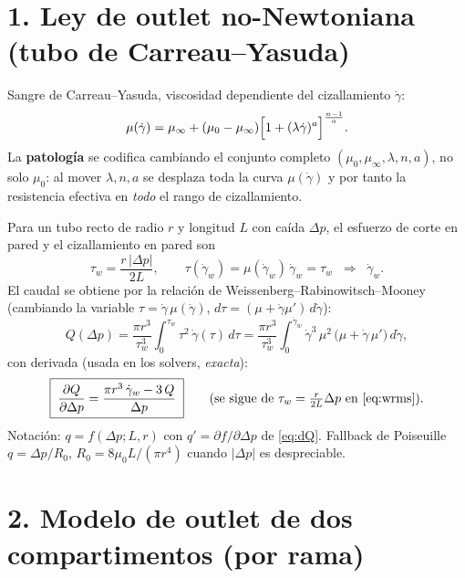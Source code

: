 \documentclass[11pt]{article}
\newcommand{\dd}[2]{\frac{\partial #1}{\partial #2}}
\begin{document}
\section*{1. Ley de outlet no-Newtoniana (tubo de Carreau--Yasuda)}

Sangre de Carreau--Yasuda, viscosidad dependiente del cizallamiento $\dot\gamma$:
\begin{equation}
  \mu(\dot\gamma)=\mu_\infty+(\mu_0-\mu_\infty)
  \Bigl[1+(\lambda\dot\gamma)^{a}\Bigr]^{\frac{n-1}{a}} .
  \label{eq:cy}
\end{equation}
La \textbf{patología} se codifica cambiando el conjunto completo
$(\mu_0,\mu_\infty,\lambda,n,a)$, no solo $\mu_0$: al mover $\lambda,n,a$ se
desplaza toda la curva $\mu(\dot\gamma)$ y por tanto la resistencia efectiva en
\emph{todo} el rango de cizallamiento.

Para un tubo recto de radio $r$ y longitud $L$ con caída $\Delta p$, el esfuerzo
de corte en pared y el cizallamiento en pared son
\begin{equation}
  \tau_w=\frac{r\,|\Delta p|}{2L},
  \qquad
  \tau(\dot\gamma_w)=\mu(\dot\gamma_w)\,\dot\gamma_w=\tau_w
  \;\;\Rightarrow\;\;\dot\gamma_w .
  \label{eq:wall}
\end{equation}
El caudal se obtiene por la relación de Weissenberg--Rabinowitsch--Mooney
(cambiando la variable $\tau=\dot\gamma\,\mu(\dot\gamma)$,
$d\tau=(\mu+\dot\gamma\mu')\,d\dot\gamma$):
\begin{equation}
  Q(\Delta p)=\frac{\pi r^3}{\tau_w^{3}}
  \int_{0}^{\tau_w}\!\tau^2\,\dot\gamma(\tau)\,d\tau
  =\frac{\pi r^3}{\tau_w^{3}}
  \int_{0}^{\dot\gamma_w}\!\dot\gamma^{3}\,\mu^2\,
  \bigl(\mu+\dot\gamma\,\mu'\bigr)\,d\dot\gamma ,
  \label{eq:wrms}
\end{equation}
con derivada (usada en los solvers, \emph{exacta}):
\begin{equation}
  \boxed{\;\dd{Q}{\Delta p}=\frac{\pi r^3\,\dot\gamma_w-3\,Q}{\Delta p}\;}
  \qquad\text{(se sigue de }\tau_w=\tfrac{r}{2L}\Delta p\text{ en }\eqref{eq:wrms}).
  \label{eq:dQ}
\end{equation}
Notación: $q=f(\Delta p;L,r)$ con $q'=\partial f/\partial\Delta p$ de
\eqref{eq:dQ}. Fallback de Poiseuille $q=\Delta p/R_0$,
$R_0=8\mu_0 L/(\pi r^4)$ cuando $|\Delta p|$ es despreciable.

\section*{2. Modelo de outlet de dos compartimentos (por rama)}
\end{document}
